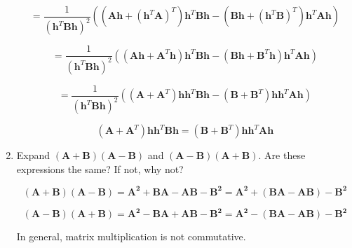 \documentclass[fleqn]{article}
\begin{document}
\begin{enumerate}
		\begin{equation*}
			 = \frac{1}{(\mathbf{h}^T\mathbf{B}\mathbf{h})^2}\left(\left(\mathbf{Ah} + \left(\mathbf{h}^T\mathbf{A}\right)^T\right)\mathbf{h}^T\mathbf{B}\mathbf{h} - \left(\mathbf{Bh} + \left(\mathbf{h}^T\mathbf{B}\right)^T\right)\mathbf{h}^T\mathbf{A}\mathbf{h}\right)
		\end{equation*}
		
		\begin{equation*}
			 = \frac{1}{(\mathbf{h}^T\mathbf{B}\mathbf{h})^2}\left(\left(\mathbf{Ah} + \mathbf{A}^T\mathbf{h}\right)\mathbf{h}^T\mathbf{B}\mathbf{h} - \left(\mathbf{Bh} + \mathbf{B}^T\mathbf{h}\right)\mathbf{h}^T\mathbf{A}\mathbf{h}\right)
		\end{equation*}
		
		\begin{equation*}
			 = \frac{1}{(\mathbf{h}^T\mathbf{B}\mathbf{h})^2}\left(\left(\mathbf{A} + \mathbf{A}^T\right)\mathbf{h}\mathbf{h}^T\mathbf{B}\mathbf{h} - \left(\mathbf{B} + \mathbf{B}^T\right)\mathbf{h}\mathbf{h}^T\mathbf{A}\mathbf{h}\right)
		\end{equation*}
		
		\begin{equation*}
			\left(\mathbf{A} + \mathbf{A}^T\right)\mathbf{h}\mathbf{h}^T\mathbf{B}\mathbf{h} = \left(\mathbf{B} + \mathbf{B}^T\right)\mathbf{h}\mathbf{h}^T\mathbf{A}\mathbf{h}
		\end{equation*}
		
		\item Expand $(\mathbf{A} + \mathbf{B})(\mathbf{A} - \mathbf{B})$ and $(\mathbf{A} - \mathbf{B})(\mathbf{A} + \mathbf{B})$. Are these expressions the same? If not, why not?
		
		\begin{equation*}
		(\mathbf{A} + \mathbf{B})(\mathbf{A} - \mathbf{B}) = \mathbf{A^2} + \mathbf{B}\mathbf{A} - \mathbf{A}\mathbf{B} - \mathbf{B^2} = \mathbf{A^2} + (\mathbf{B}\mathbf{A} - \mathbf{A}\mathbf{B}) - \mathbf{B^2}
		\end{equation*}
		
		\begin{equation*}
		(\mathbf{A} - \mathbf{B})(\mathbf{A} + \mathbf{B}) = \mathbf{A^2} - \mathbf{B}\mathbf{A} + \mathbf{A}\mathbf{B} - \mathbf{B^2} = \mathbf{A^2} - (\mathbf{B}\mathbf{A} - \mathbf{A}\mathbf{B}) - \mathbf{B^2}
		\end{equation*}
		
		In general, matrix multiplication is not commutative.
		

\end{enumerate}
\end{document}
